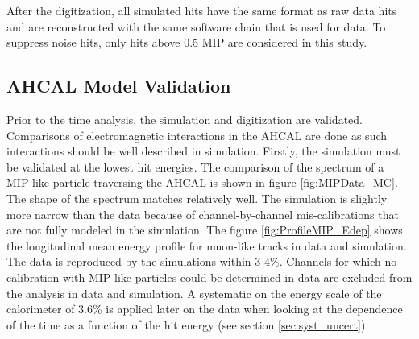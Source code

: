 \documentclass{JINST}
\begin{document}
After the digitization, all simulated hits have the same format as raw data hits and are reconstructed with the same software chain that is used for data. To suppress noise hits, only hits above 0.5 MIP are considered in this study.

\subsection{AHCAL Model Validation}

Prior to the time analysis, the simulation and digitization are validated. Comparisons of electromagnetic interactions in the AHCAL are done as such interactions should be well described in simulation. Firstly, the simulation must be validated at the lowest hit energies. The comparison of the spectrum of a MIP-like particle traversing the AHCAL is shown in figure \ref{fig:MIPData_MC}. The shape of the spectrum matches relatively well. The simulation is slightly more narrow than the data because of channel-by-channel mis-calibrations that are not fully modeled in the simulation. The figure \ref{fig:ProfileMIP_Edep} shows the longitudinal mean energy profile for muon-like tracks in data and simulation. The data is reproduced by the simulations within 3-4\%. Channels for which no calibration with MIP-like particles could be determined in data are excluded from the analysis in data and simulation. A systematic on the energy scale of the calorimeter of 3.6\% is applied later on the data when looking at the dependence of the time as a function of the hit energy (see section \ref{sec:syst_uncert}).
\end{document}

